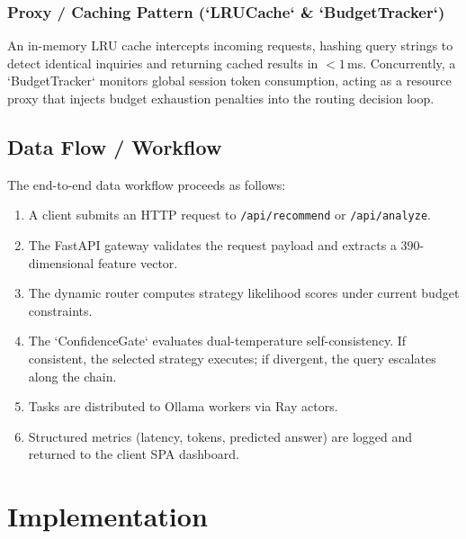 \documentclass[12pt,a4paper]{report}
\begin{document}
\subsection{Proxy / Caching Pattern (`LRUCache` \& `BudgetTracker`)}
An in-memory LRU cache intercepts incoming requests, hashing query strings to detect identical inquiries and returning cached results in $<1$\,ms. Concurrently, a `BudgetTracker` monitors global session token consumption, acting as a resource proxy that injects budget exhaustion penalties into the routing decision loop.

\section{Data Flow / Workflow}
\label{sec:data_flow_workflow}
The end-to-end data workflow proceeds as follows:
\begin{enumerate}[leftmargin=*]
    \item A client submits an HTTP request to \texttt{/api/recommend} or \texttt{/api/analyze}.
    \item The FastAPI gateway validates the request payload and extracts a $390$-dimensional feature vector.
    \item The dynamic router computes strategy likelihood scores under current budget constraints.
    \item The `ConfidenceGate` evaluates dual-temperature self-consistency. If consistent, the selected strategy executes; if divergent, the query escalates along the chain.
    \item Tasks are distributed to Ollama workers via Ray actors.
    \item Structured metrics (latency, tokens, predicted answer) are logged and returned to the client SPA dashboard.
\end{enumerate}

\chapter{Implementation}
\label{ch:implementation}
\end{document}
